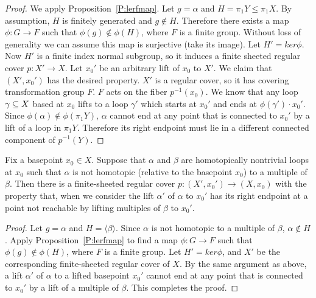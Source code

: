 \begin{proof}

We apply Proposition~\ref{P:lerfmap}. Let $g = \alpha$ and $H = \pi_1Y \leq
\pi_1X$.  By assumption, $H$ is finitely generated and $g \notin H$. Therefore
there exists a map $\phi \colon G \to F$ such that $\phi(g) \notin \phi(H)$,
where $F$ is a finite group.  Without loss of generality we can assume this map
is surjective (take its image). Let $H' = ker \phi$. Now $H'$ is a finite index
normal subgroup, so it induces a finite sheeted regular cover $p \colon X' \to
X$.  Let $x_0'$ be an arbitrary lift of $x_0$ to $X'$. We claim that
$(X',x_0')$ has the desired property.  $X'$ is a regular cover, so it has
covering transformation group $F$.  $F$ acts on the fiber $p^{-1}(x_0)$. We
know that any loop $\gamma \subseteq X$ based at $x_0$ lifts to a loop $\gamma'$
which starts at $x_0'$ and ends at $\phi(\gamma') \cdot x_0'$.  Since
$\phi(\alpha) \notin \phi(\pi_1Y)$, $\alpha$ cannot end at any point that is
connected to $x_0'$ by a lift of a loop in $\pi_1Y$.  Therefore its right
endpoint must lie in a different connected component of $p^{-1}(Y)$.

\end{proof}

\begin{prop}\label{P:lerf2}

Fix a basepoint $x_0 \in X$.  Suppose that $\alpha$ and $\beta$ are
homotopically nontrivial loops at $x_0$ such that $\alpha$ is not homotopic
(relative to the basepoint $x_0$) to a multiple of $\beta$.  Then there is
a finite-sheeted regular cover $p \colon (X',x_0') \to (X,x_0)$ with the
property that, when we consider the lift $\alpha'$ of $\alpha$ to $x_0'$ has
its right endpoint at a point not reachable by lifting multiples of $\beta$ to
$x_0'$.

\end{prop}

\begin{proof}

Let $g = \alpha$ and $H = \langle\beta\rangle$. Since $\alpha$ is not homotopic
to a multiple of $\beta$, $\alpha \notin H$. Apply Proposition~\ref{P:lerfmap}
to find a map $\phi \colon G \to F$ such that $\phi(g) \notin \phi(H)$, where
$F$ is a finite group.  Let $H' = ker \phi$, and $X'$ be the corresponding
finite-sheeted regular cover of $X$. By the same argument as above, a lift
$\alpha'$ of $\alpha$ to a lifted basepoint $x_0'$ cannot end at any point that
is connected to $x_0'$ by a lift of a multiple of $\beta$. This completes the
proof.

\end{proof}

